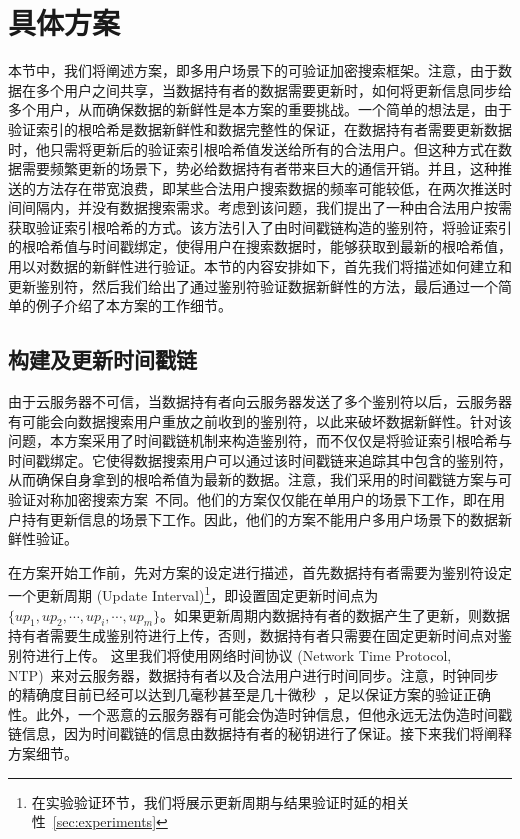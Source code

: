 \section{具体方案}
本节中，我们将阐述\multi 方案，即多用户场景下的可验证加密搜索框架。注意，由于数据在多个用户之间共享，当数据持有者的数据需要更新时，如何将更新信息同步给多个用户，从而确保数据的新鲜性是本方案的重要挑战。一个简单的想法是，由于验证索引的根哈希是数据新鲜性和数据完整性的保证，在数据持有者需要更新数据时，他只需将更新后的验证索引根哈希值发送给所有的合法用户。但这种方式在数据需要频繁更新的场景下，势必给数据持有者带来巨大的通信开销。并且，这种推送的方法存在带宽浪费，即某些合法用户搜索数据的频率可能较低，在两次推送时间间隔内，并没有数据搜索需求。考虑到该问题，我们提出了一种由合法用户按需获取验证索引根哈希的方式。该方法引入了由时间戳链构造的鉴别符，将验证索引的根哈希值与时间戳绑定，使得用户在搜索数据时，能够获取到最新的根哈希值，用以对数据的新鲜性进行验证。本节的内容安排如下，首先我们将描述如何建立和更新鉴别符，然后我们给出了通过鉴别符验证数据新鲜性的方法，最后通过一个简单的例子介绍了本方案的工作细节。

\subsection{构建及更新时间戳链}
由于云服务器不可信，当数据持有者向云服务器发送了多个鉴别符以后，云服务器有可能会向数据搜索用户重放之前收到的鉴别符，以此来破坏数据新鲜性。针对该问题，本方案采用了时间戳链机制来构造鉴别符，而不仅仅是将验证索引根哈希与时间戳绑定。它使得数据搜索用户可以通过该时间戳链来追踪其中包含的鉴别符，从而确保自身拿到的根哈希值为最新的数据。注意，我们采用的时间戳链方案与可验证对称加密搜索方案~\cite{stefanov2014practical}不同。他们的方案仅仅能在单用户的场景下工作，即在用户持有更新信息的场景下工作。因此，他们的方案不能用户多用户场景下的数据新鲜性验证。

在方案开始工作前，先对方案的设定进行描述，首先数据持有者需要为鉴别符设定一个更新周期 (Update Interval)\footnote{在实验验证环节，我们将展示更新周期与结果验证时延的相关性~\ref{sec:experiments}}，即设置固定更新时间点为$\{up_1, up_2, \cdots, up_i, \cdots, up_m\}$。如果更新周期内数据持有者的数据产生了更新，则数据持有者需要生成鉴别符进行上传，否则，数据持有者只需要在固定更新时间点对鉴别符进行上传。
这里我们将使用网络时间协议 (Network Time Protocol, NTP)~\cite{mills1991internet, mills2010network}来对云服务器，数据持有者以及合法用户进行时间同步。注意，时钟同步的精确度目前已经可以达到几毫秒甚至是几十微秒~\cite{kopetz1987clock, elson2002fine, zhou2007accurate}，足以保证\multi 方案的验证正确性。此外，一个恶意的云服务器有可能会伪造时钟信息，但他永远无法伪造时间戳链信息，因为时间戳链的信息由数据持有者的秘钥进行了保证。接下来我们将阐释方案细节。

